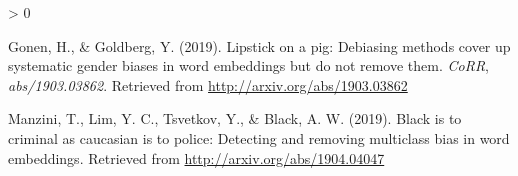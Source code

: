 \documentclass[
  12pt,
]{book}
\newlength{\cslhangindent}
\newenvironment{CSLReferences}[2] %
 {%
  \setlength{\parindent}{0pt}
  \ifodd #1 \everypar{\setlength{\hangindent}{\cslhangindent}}\ignorespaces\fi
  \ifnum #2 > 0
  \setlength{\parskip}{#2\baselineskip}
  \fi
 }%
 {}
\begin{document}
\hypertarget{refs}{}
\begin{CSLReferences}{1}{0}
\leavevmode\hypertarget{ref-Gonen2019Lipstick}{}%
Gonen, H., \& Goldberg, Y. (2019). Lipstick on a pig: Debiasing methods cover up systematic gender biases in word embeddings but do not remove them. \emph{CoRR}, \emph{abs/1903.03862}. Retrieved from \url{http://arxiv.org/abs/1903.03862}

\leavevmode\hypertarget{ref-Manzini2019blackToCriminal}{}%
Manzini, T., Lim, Y. C., Tsvetkov, Y., \& Black, A. W. (2019). Black is to criminal as caucasian is to police: Detecting and removing multiclass bias in word embeddings. Retrieved from \url{http://arxiv.org/abs/1904.04047}

\end{CSLReferences}
\end{document}
